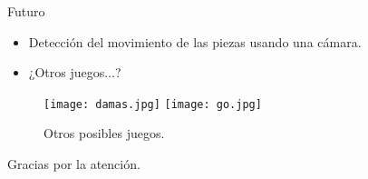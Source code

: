 \documentclass[11pt]{beamer}
\begin{document}
\begin{frame}{Futuro}
  \begin{itemize}
  \item Detección del movimiento de las piezas usando una cámara.
  \item ¿Otros juegos...?
  \end{itemize}
  \vspace{.5cm}
  \begin{figure}[h!]
    \centering
    \texttt{[image: damas.jpg]}
    \hspace{1cm}
    \texttt{[image: go.jpg]}
    \caption{Otros posibles juegos.}
  \end{figure}
\end{frame}

\begin{frame}
    \begin{center}
        Gracias por la atención.
    \end{center}
\end{frame}
\end{document}
